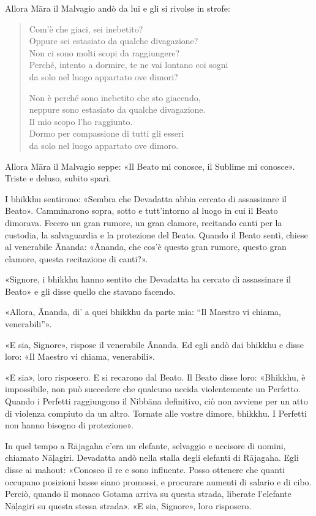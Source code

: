 Allora Māra il Malvagio andò da lui e gli si rivolse in strofe:

\begin{quote}
Com’è che giaci, sei inebetito? \\
Oppure sei estasiato da qualche divagazione? \\
Non ci sono molti scopi da raggiungere? \\
Perché, intento a dormire, te ne vai lontano coi sogni \\
da solo nel luogo appartato ove dimori?

Non è perché sono inebetito che sto giacendo, \\
neppure sono estasiato da qualche divagazione. \\
Il mio scopo l’ho raggiunto. \\
Dormo per compassione di tutti gli esseri \\
da solo nel luogo appartato ove dimoro.
\end{quote}

Allora Māra il Malvagio seppe: «Il Beato mi conosce, il Sublime mi conosce».
Triste e deluso, subito sparì.


 I bhikkhu sentirono: «Sembra che Devadatta abbia cercato
di assassinare il Beato». Camminarono sopra, sotto e tutt’intorno al luogo in
cui il Beato dimorava. Fecero un gran rumore, un gran clamore, recitando canti
per la custodia, la salvaguardia e la protezione del Beato. Quando il Beato
sentì, chiese al venerabile Ānanda: «Ānanda, che cos’è questo gran rumore,
questo gran clamore, questa recitazione di canti?».

«Signore, i bhikkhu hanno sentito che Devadatta ha cercato di assassinare il
Beato» e gli disse quello che stavano facendo.

«Allora, Ānanda, di' a quei bhikkhu da parte mia: “Il Maestro vi chiama,
venerabili”».

«E sia, Signore», rispose il venerabile Ānanda. Ed egli andò dai bhikkhu e disse
loro: «Il Maestro vi chiama, venerabili».

«E sia», loro risposero. E si recarono dal Beato. Il Beato disse loro: «Bhikkhu,
è impossibile, non può succedere che qualcuno uccida violentemente un Perfetto.
Quando i Perfetti raggiungono il Nibbāna definitivo, ciò non avviene per un atto
di violenza compiuto da un altro. Tornate alle vostre dimore, bhikkhu. I
Perfetti non hanno bisogno di protezione».

In quel tempo a Rājagaha c’era un elefante, selvaggio e uccisore di uomini,
chiamato Nāḷagiri. Devadatta andò nella stalla degli elefanti di Rājagaha. Egli
disse ai mahout: «Conosco il re e sono influente. Posso ottenere che quanti
occupano posizioni basse siano promossi, e procurare aumenti di salario e di
cibo. Perciò, quando il monaco Gotama arriva su questa strada, liberate
l’elefante Nāḷagiri su questa stessa strada». «E sia, Signore», loro risposero.

